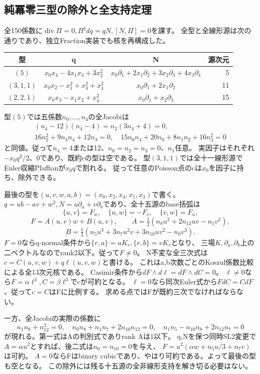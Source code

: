 \documentclass[a4paper,11pt]{ltjsarticle}
\theoremstyle{definition}
\begin{document}
\subsection{純冪零三型の除外と全支持定理}
全150係数に$\operatorname{div}\Pi=0,\Pi^\sharp dq=qN,[N,\Pi]=0$を課す。
全型と全線形源は次の通りであり、独立Fraction実装でも核を再構成した。
\begin{center}\small
\begin{tabular}{c|c|c|r}
型&q&N&源次元\\\hline
$(5)$&$x_0x_4-4x_1x_3+3x_2^2$&$x_0\partial_1+2x_1\partial_2+3x_2\partial_3+4x_3\partial_4$&5\\
$(3,1,1)$&$x_0x_2-x_1^2+x_3^2+x_4^2$&$x_0\partial_1+2x_1\partial_2$&11\\
$(2,2,1)$&$x_0x_3-x_1x_2+x_4^2$&$x_0\partial_1+x_2\partial_3$&15
\end{tabular}
\end{center}
型$(5)$では五係数$n_0,\ldots,n_4$の全Jacobiは
\[
\begin{gathered}
 (n_4-12)(n_4-4)=n_2(3n_4+4)=0,\\
 16n_2^2+9n_3n_4+12n_3=0,\quad
 15n_0n_4+20n_0+8n_1n_2+16n_3^2=0
\end{gathered}
\]
と同値。従って$n_4=4$または12、$n_0=n_2=n_3=0$、$n_1$任意。
実因子はそれぞれ$-x_0q^2/2$、0であり、既約cの型は空である。
型$(3,1,1)$では全十一線形源でEuler収縮Pfaffianが$x_0q$で割れる。
従って任意のPoisson点のcは$x_0$を因子に持ち、除外できる。

最後の型を$(u,v,w,a,b)=(x_0,x_2,x_4,x_1,x_3)$で書く。
$q=ub-av+w^2,N=u\partial_a+v\partial_b$であり、全十五源のbase括弧は
\[
 \{u,v\}=F_w,\quad\{u,w\}=-F_v,\quad\{v,w\}=F_u,
\]
\[
 F=A(u,v)w+B(u,v),\qquad A=\tfrac12(n_8u^2+2n_{12}uv-n_1v^2),
\]
\[
 B=\tfrac13(n_5u^3+3n_7u^2v+3n_{10}uv^2-n_0v^3).
\]
$F=0$ならq-normal条件から$\{r,a\}=uK_r,\{r,b\}=vK_r$となり、
三場$K,\partial_a,\partial_b$上の二ベクトルなのでrank2以下。従って$F\ne0$。
N不変な全三次式は$c=C(u,v,w)+q\ell(u,v,w)$と書ける。
これはa,b次数ごとのKoszul係数比較による全13次元核である。
Casimir条件から$dF\wedge d\ell=dF\wedge dC=0$。
$\ell\ne0$なら$F=\alpha\ell^3,C=\beta\ell^3$でcが可約となる。
$\ell=0$なら同次Euler式から$FdC=CdF$、従って$c=C$はFに比例する。
求める点ではFが既約三次でなければならない。

一方、全Jacobiの実際の係数に
\[
 n_1n_8+n_{12}^2=0,\quad n_0n_8+n_1n_7+2n_{10}n_{12}=0,\quad
 n_1n_5-n_{10}n_8+2n_{12}n_7=0
\]
が現れる。第一式はAの判別式でありrank Aは1以下。
q,Nを保つ同時SL2変更で$A=\alpha u^2$とすれば、後二式は$n_0=n_{10}=0$を与え、
$F=u^2(\alpha w+n_5u/3+n_7v)$は可約。
$A=0$ならFはbinary cubicであり、やはり可約である。よって最後の型も空となる。
この除外には残る十五源の全非線形支持を解き切る必要はない。
\end{document}
